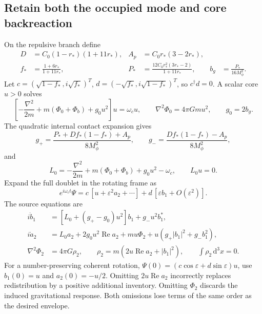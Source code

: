 \documentclass[11pt]{article}
\newcommand{\dd}{\mathrm d}
\newcommand{\mf}{M_\phi}
\newcommand{\Rea}{\operatorname{Re}}
\newcommand{\lap}{\nabla^2}
\begin{document}
\subsection{Retain both the occupied mode and core backreaction}
On the repulsive branch define
\begin{align}
 D&=C_0(1-r_*)(1+11r_*),&
 A_p&=C_0r_*(3-2r_*),\\
 f_*&=\frac{1+6r_*}{1+11r_*},&
 P_*&=\frac{12C_0r_*^2(3r_*-2)}{1+11r_*},&
 b_g&=\frac{P_*}{16\mf^2}.
\end{align}
Let $c=(\sqrt{1-f_*},i\sqrt{f_*})^T$, $d=(-\sqrt{f_*},i\sqrt{1-f_*})^T$, so $c^\dagger d=0$. A scalar core $u>0$ solves
\begin{equation}
 \left[-\frac{\lap}{2m}+m(\Phi_0+\Phi_b)+g_0u^2\right]u=\omega_cu,
 \qquad \lap\Phi_0=4\pi Gmu^2,\qquad g_0=2b_g.
 \label{ext:core}
\end{equation}
The quadratic internal contact expansion gives
\begin{equation}
 g_+=\frac{P_*+Df_*(1-f_*)+A_p}{8\mf^2},\qquad
 g_-=\frac{Df_*(1-f_*)-A_p}{8\mf^2},
\end{equation}
and
\begin{equation}
 L_0=-\frac{\lap}{2m}+m(\Phi_0+\Phi_b)+g_0u^2-\omega_c,
 \qquad L_0u=0.
\end{equation}
Expand the full doublet in the rotating frame as
\begin{equation}
 e^{i\omega_ct}\Psi
 =c\,[u+\varepsilon^2a_2+\cdots]+d\,[\varepsilon b_1+O(\varepsilon^2)].
\end{equation}
The source equations \cite[Section S5.3]{channelsupp} are
\begin{align}
 i\dot b_1&=[L_0+(g_+-g_0)u^2]b_1+g_-u^2b_1^*,\\
 i\dot a_2&=L_0a_2+2g_0u^2\Rea a_2+mu\Phi_2
                         +u(g_+|b_1|^2+g_-b_1^2),\label{ext:a2}\\
 \lap\Phi_2&=4\pi G\rho_2,\qquad
 \boxed{\rho_2=m(2u\Rea a_2+|b_1|^2),\qquad \int\rho_2\,\dd^3x=0.}
 \label{ext:rho2}
\end{align}
For a number-preserving coherent rotation, $\Psi(0)=(c\cos\varepsilon+d\sin\varepsilon)u$, use $b_1(0)=u$ and $a_2(0)=-u/2$. Omitting $2u\Rea a_2$ incorrectly replaces redistribution by a positive additional inventory. Omitting $\Phi_2$ discards the induced gravitational response. Both omissions lose terms of the same order as the desired envelope.
\end{document}
